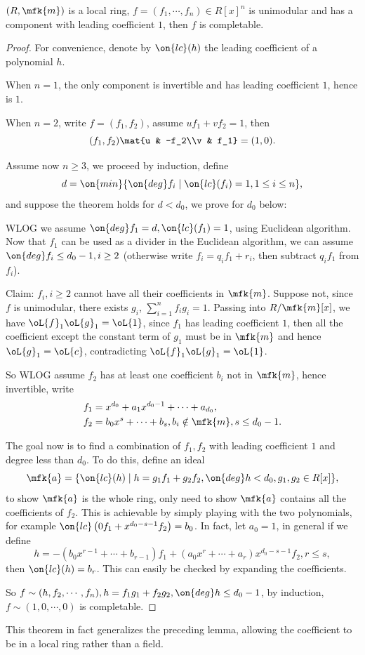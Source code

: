 \begin{thm}[Horrock]\label{thm:local}
	$(R,\mfk{m})$ is a local ring, $f=(f_1,\cdots,f_n)\in R[x]^n$ is unimodular and has a component with leading coefficient $1$, then $f$ is completable.
\end{thm}
\begin{proof}
	For convenience, denote by $\on{lc}(h)$ the leading coefficient of a polynomial $h$.

	When $n=1$, the only component is invertible and has leading coefficient $1$, hence is $1$.
	
	When $n=2$, write $f=(f_1,f_2)$, assume $uf_1+vf_2=1$, then
	$$
	(f_1,f_2)\mat{u & -f_2\\v & f_1} = (1,0).
	$$
	
	Assume now $n\geq 3$, we proceed by induction, define
	$$
	d=\on{min}\{\on{deg}f_i\mid \on{lc}(f_i)=1, 1\leq i\leq n\},
	$$
	and suppose the theorem holds for $d<d_0$, we prove for $d_0$ below:
	
	WLOG we assume $\on{deg}f_1=d, \on{lc}(f_1)=1$, using Euclidean algorithm. Now that $f_1$ can be used as a divider in the Euclidean algorithm, we can assume $\on{deg}f_i\leq d_0-1, i\geq 2$ (otherwise write $f_i = q_if_1+r_i$, then subtract $q_if_1$ from $f_i$).
	
	Claim: $f_i, i\geq 2$ cannot have all their coefficients in $\mfk{m}$. Suppose not, since $f$ is unimodular, there exists $g_i$, $\sum_{i=1}^nf_ig_i=1$. Passing into $R/\mfk{m}[x]$, we have $\oL{f}_1\oL{g}_1=\oL{1}$, since $f_1$ has leading coefficient $1$, then all the coefficient except the constant term of $g_1$ must be in $\mfk{m}$ and hence $\oL{g}_1=\oL{c}$, contradicting $\oL{f}_1\oL{g}_1=\oL{1}$.
	
	So WLOG assume $f_2$ has at least one coefficient $b_i$ not in $\mfk{m}$, hence invertible, write
	\begin{align*}
		&f_1=x^{d_0}+a_1x^{d_0-1}+\cdots +a_{d_0},\\
		&f_2=b_0x^s+\cdots+b_s, b_i\notin\mfk{m}, s\leq d_0-1.
	\end{align*}
	
	The goal now is to find a combination of $f_1,f_2$ with leading coefficient $1$ and degree less than $d_0$. To do this, define an ideal
	$$
	\mfk{a}=\{\on{lc}(h)\mid h=g_1f_1+g_2f_2, \on{deg}h<d_0, g_1,g_2\in R[x]\},
	$$
	to show $\mfk{a}$ is the whole ring, only need to show $\mfk{a}$ contains all the coefficients of $f_2$. This is achievable by simply playing with the two polynomials, for example $\on{lc}\left(0f_1+x^{d_0-s-1}f_2\right)=b_0$. In fact, let $a_0=1$, in general if we define
	$$
	h=-(b_0x^{r-1}+\cdots+b_{r-1})f_1+(a_0x^r+\cdots+a_r)x^{d_0-s-1}f_2, r\leq s,
	$$
	then $\on{lc}(h)=b_r$. This can easily be checked by expanding the coefficients.
	
	So $f\sim (h,f_2,\cdots, f_n), h=f_1g_1+f_2g_2, \on{deg} h\leq d_0-1$, by induction, $f\sim (1,0,\cdots,0)$ is completable.
\end{proof}
\begin{rmk}
	This theorem in fact generalizes the preceding lemma, allowing the coefficient to be in a local ring rather than a field.
\end{rmk}

